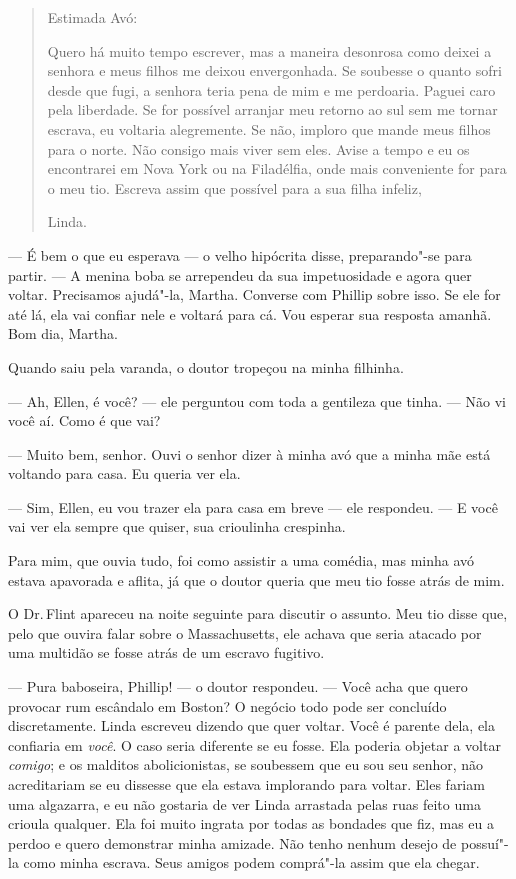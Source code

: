 \begin{quote}
Estimada Avó:

Quero há muito tempo escrever, mas a maneira desonrosa como deixei
a senhora e meus filhos me deixou envergonhada. Se soubesse o quanto
sofri desde que fugi, a senhora teria pena de mim e me perdoaria. Paguei
caro pela liberdade. Se for possível arranjar meu retorno ao sul sem me
tornar escrava, eu voltaria alegremente. Se não, imploro que mande meus
filhos para o norte. Não consigo mais viver sem eles. Avise a tempo e eu
os encontrarei em Nova York ou na Filadélfia, onde mais conveniente for
para o meu tio. Escreva assim que possível para a sua filha infeliz,

\hfill{}Linda.
\end{quote}

--- É bem o que eu esperava --- o velho
hipócrita disse, preparando"-se para partir. --- A menina boba se
arrependeu da sua impetuosidade e agora quer voltar. Precisamos
ajudá"-la, Martha. Converse com Phillip sobre isso. Se ele for até lá,
ela vai confiar nele e voltará para cá. Vou esperar sua resposta amanhã.
Bom dia, Martha.

Quando saiu pela varanda, o doutor
tropeçou na minha filhinha.

--- Ah, Ellen, é você? --- ele perguntou com toda a gentileza que tinha.
--- Não vi você aí. Como é que vai?

--- Muito bem, senhor. Ouvi o senhor
dizer à minha avó que a minha mãe está voltando para casa. Eu queria ver
ela.

--- Sim, Ellen, eu vou trazer ela para
casa em breve --- ele respondeu. --- E você vai ver ela sempre que
quiser, sua crioulinha crespinha.

Para mim, que ouvia tudo, foi como
assistir a uma comédia, mas minha avó estava apavorada e aflita, já que
o doutor queria que meu tio fosse atrás de mim.

O Dr.\,Flint apareceu na noite seguinte
para discutir o assunto. Meu tio disse que, pelo que ouvira falar sobre
o Massachusetts, ele achava que seria atacado por uma multidão se fosse
atrás de um escravo fugitivo.

--- Pura baboseira, Phillip! --- o doutor respondeu. --- Você acha que
quero provocar rum escândalo em Boston? O negócio todo pode ser
concluído discretamente. Linda escreveu dizendo que quer voltar. Você é
parente dela, ela confiaria em \emph{você}. O caso seria diferente se eu
fosse. Ela poderia objetar a voltar \emph{comigo}; e os malditos
abolicionistas, se soubessem que eu sou seu senhor, não acreditariam se
eu dissesse que ela estava implorando para voltar. Eles fariam uma
algazarra, e eu não gostaria de ver Linda arrastada pelas ruas feito uma
crioula qualquer. Ela foi muito ingrata por todas as bondades que fiz,
mas eu a perdoo e quero demonstrar minha amizade. Não tenho nenhum
desejo de possuí"-la como minha escrava. Seus amigos podem comprá"-la
assim que ela chegar.

